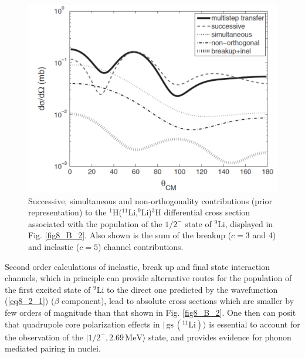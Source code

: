  \begin{figure}
 	\centerline{\includegraphics*[width=12cm,angle=0]{C8/figsC8/fig8_B_3}}
 	\caption{Successive, simultaneous and non-orthogonality contributions (prior representation)
 		to the  $^1$H($^{11}$Li,$^9$Li)$^3$H differential cross section
 		associated with the population of the $1/2^-$ state
 		of $^9$Li, displayed in Fig. \ref{fig8_B_2}. Also shown is the  sum of the breakup ($c=3$ and 4) and inelastic ($c=5$) channel contributions.}\label{fig8_B_3}
 \end{figure}
 
 Second order calculations of inelastic, break up and final state interaction channels, which in principle can provide alternative routes for the population of the first excited state of $^9$Li  to the direct one predicted by the wavefunction (\ref{eq8_2_1})  ($\beta$ component), lead to absolute cross sections which are smaller by few orders of magnitude than that shown in Fig. \ref{fig8_B_2}. One then can posit that quadrupole core polarization effects in $|\,\text{gs}\,(^{11}\text{Li})\rangle$ is essential to account for the observation of the $|1/2^-,2.69\,\text{MeV}\rangle$ state, and provides evidence for phonon mediated pairing in nuclei. 

